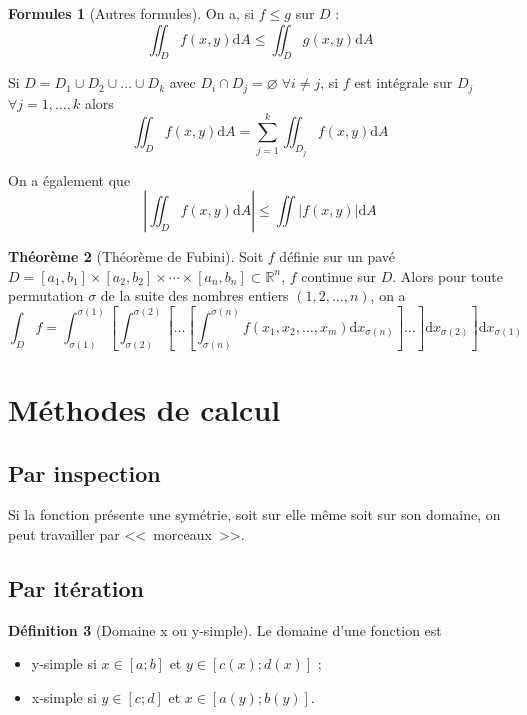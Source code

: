 \documentclass[11pt,a4paper]{article}
\theoremstyle{definition}
\newtheorem{mydef}{Définition}[section]
\newtheorem{myform}[mydef]{Formules}
\newtheorem{mytheo}[mydef]{Théorème}
\newcommand{\R}{\mathbb{R}}
\newcommand{\dif}{\mathrm{d}}
\begin{document}
\begin{myform}[Autres formules] On a, si $f \leq g$ sur $D$ :
\[ \iint_D f(x,y) \dif A \leq \iint_D g(x,y) \dif A \]

Si $D = D_1 \cup D_2 \cup \dots \cup D_k$ avec $D_i \cap D_j = \varnothing \; \forall i \neq j$, si $f$ est intégrale sur $D_j$ $\forall j = 1, \dots, k$ alors
\[ \iint_D f(x,y) \dif A = \sum_{j=1}^k \iint_{D_j} f(x,y) \dif A \]

On a également que
\[ \left| \iint_D f(x,y) \dif A \right| \leq \iint \left| f(x,y) \right| \dif A \]
\end{myform}

\begin{mytheo}[Théorème de Fubini] Soit $f$ définie sur un pavé $D = [a_1,b_1] \times [a_2,b_2] \times \cdots \times [a_n,b_n] \subset \R^n$, $f$ continue sur $D$. Alors pour toute permutation $\sigma$ de la suite des nombres entiers $(1,2,\dots, n)$, on a
\[ \int_D f = \int_{\sigma(1)}^{\sigma(1)} \left[ \int_{\sigma(2)}^{\sigma(2)}   \left[ \dots \left[ \int_{\sigma(n)}^{\sigma(n)} f(x_1,x_2,\dots,x_m) \dif x_{\sigma(n)} \right]   \dots \right] \dif x_{\sigma(2)} \right] \dif x_{\sigma(1)} \]
\end{mytheo}

\section{Méthodes de calcul}

\subsection{Par inspection} Si la fonction présente une symétrie, soit sur elle même soit sur son domaine, on peut travailler par <<~morceaux~>>.

\subsection{Par itération}

\begin{mydef}[Domaine x ou y-simple]
Le domaine d'une fonction est
\begin{itemize}
\item y-simple si $x \in [a;b]$ et $y \in [c(x);d(x)]$ ;
\item x-simple si $y \in [c;d]$ et $x \in [a(y);b(y)]$.
\end{itemize}
\end{mydef}
\end{document}

